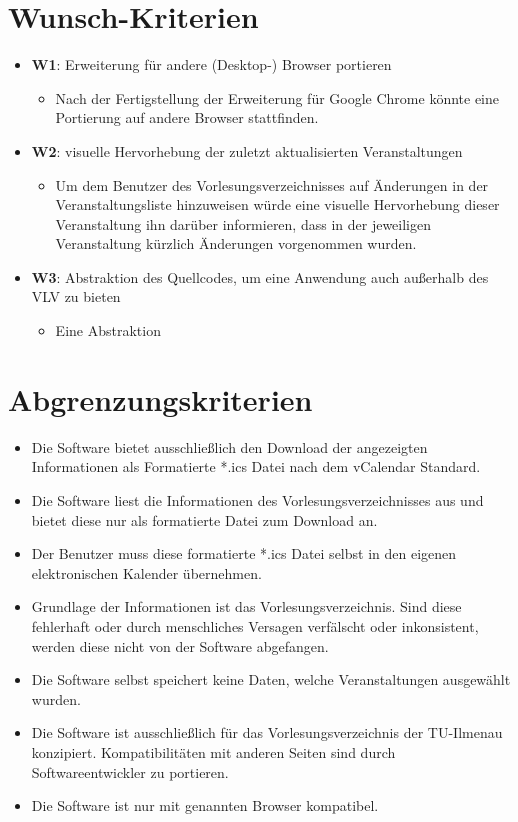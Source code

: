 \documentclass[11pt]{scrreprt}
\begin{document}
\section{Wunsch-Kriterien}
\begin{itemize}
\item \textbf{W1}: Erweiterung für andere (Desktop-) Browser portieren
    \begin{itemize}
    \item Nach der Fertigstellung der Erweiterung für Google Chrome könnte eine Portierung auf andere Browser stattfinden.
    \end{itemize}
\item \textbf{W2}: visuelle Hervorhebung der zuletzt aktualisierten Veranstaltungen
    \begin{itemize}
    \item Um dem Benutzer des Vorlesungsverzeichnisses auf \"Anderungen in der Veranstaltungsliste hinzuweisen würde eine visuelle Hervorhebung dieser Veranstaltung ihn darüber informieren, dass in der jeweiligen Veranstaltung k\"urzlich \"Anderungen vorgenommen wurden.
    \end{itemize}
\item \textbf{W3}: Abstraktion des Quellcodes, um eine Anwendung auch außerhalb des VLV zu bieten
    \begin{itemize}
    \item Eine Abstraktion
    \end{itemize}
\end{itemize}

\section{Abgrenzungskriterien}
\begin{itemize}
\item Die Software bietet ausschließlich den Download der angezeigten Informationen als Formatierte *.ics Datei nach dem vCalendar Standard.
\item Die Software liest die Informationen des Vorlesungsverzeichnisses aus und bietet diese nur als formatierte Datei zum Download an.
\item Der Benutzer muss diese formatierte *.ics Datei selbst in den eigenen elektronischen Kalender übernehmen.
\item Grundlage der Informationen ist das Vorlesungsverzeichnis. Sind diese fehlerhaft oder durch menschliches Versagen verfälscht oder inkonsistent, werden diese nicht von der Software abgefangen.
\item Die Software selbst speichert keine Daten, welche Veranstaltungen ausgewählt wurden.
\item Die Software ist ausschließlich für das Vorlesungsverzeichnis der TU-Ilmenau konzipiert. Kompatibilitäten mit anderen Seiten sind durch Softwareentwickler zu portieren.
\item Die Software ist nur mit genannten Browser kompatibel. 
\end{itemize}
\end{document}
